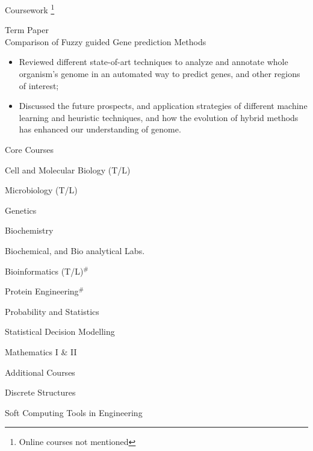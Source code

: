 \documentclass{article}
\newlength{\tabin}
\newlength{\secsep}
\newcommand{\lineunder}{\vspace*{-8pt} \\ \hspace*{-6pt} \hrulefill \\ \vspace*{-15pt}}
\newenvironment{tabbedsection}[1]{
  \begin{list}{}{
      \setlength{\itemsep}{0pt}
      \setlength{\labelsep}{0pt}
      \setlength{\labelwidth}{0pt}
      \setlength{\leftmargin}{\tabin}
      \setlength{\rightmargin}{\tabin}
      \setlength{\listparindent}{0pt}
      \setlength{\parsep}{0pt}
      \setlength{\parskip}{0pt}
      \setlength{\partopsep}{0pt}
      \setlength{\topsep}{#1}
    }
  \item[]
}{\end{list}}
\newenvironment{resume_section}[1]{
  \filbreak
  \vspace{2\secsep}
  \textsc{\large#1}
  \lineunder
  \begin{tabbedsection}{\secsep}
}{\end{tabbedsection}}
\newenvironment{resume_subsection}[2][]{
  \textbf{#2} \hfill {\footnotesize #1} \hspace{1.0em}
  \begin{tabbedsection}{0.5\secsep}
}{\end{tabbedsection}}
\newenvironment{subitems}{
  \renewcommand{\labelitemi}{$\cdot$}
  \begin{itemize}
      \setlength{\labelsep}{1em}
}{\end{itemize}}
\begin{document}
\begin{resume_section}{Coursework \footnote{Online courses not mentioned}}

  \begin{resume_subsection}{Term Paper \\ Comparison of Fuzzy guided Gene prediction Methods}
    \begin{subitems}
      \item Reviewed different state-of-art techniques to analyze and annotate whole organism's genome in an automated way to predict genes, and other regions of interest;
      \item Discussed the future prospects, and application strategies of different machine learning and heuristic techniques, and how the evolution of hybrid methods has enhanced our understanding of genome.\\
    \end{subitems}
    \end{resume_subsection}
    
\begin{resume_subsection}{Core Courses}
\vspace*{-8pt}
    \begin{subitems}
        \begin{multicols}{2}
        \item Cell and Molecular Biology (T/L)
        \item Microbiology (T/L)
        \item Genetics
        \item Biochemistry
        \item Biochemical, and Bio analytical Labs.
        \item Bioinformatics (T/L)$^{\#}$
        \item Protein Engineering$^{\#}$
        \item Probability and Statistics
        \item Statistical Decision Modelling
        \item Mathematics I \& II
        \end{multicols}
    \end{subitems}
\end{resume_subsection}

\begin{resume_subsection}{Additional Courses}
\vspace*{-8pt}
    \begin{subitems}
        \begin{multicols}{2}
        \item Discrete Structures
        \item Soft Computing Tools in Engineering
        \end{multicols}
    \end{subitems}
\end{resume_subsection}

\end{resume_section}
\end{document}
